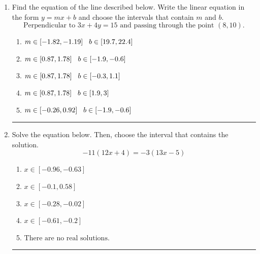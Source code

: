 \documentclass[14pt]{extbook}
\newcommand{\litem}[1]{\item#1\hspace*{-1cm}\rule{\textwidth}{0.4pt}}
\begin{document}
\begin{enumerate}
\litem{
Find the equation of the line described below. Write the linear equation in the form $ y=mx+b $ and choose the intervals that contain $m$ and $b$.\[ \text{Perpendicular to } 3 x + 4 y = 15 \text{ and passing through the point } (8, 10). \]\begin{enumerate}[label=\Alph*.]
\item \( m \in [-1.82, -1.19] \hspace*{3mm} b \in [19.7, 22.4] \)
\item \( m \in [0.87, 1.78] \hspace*{3mm} b \in [-1.9, -0.6] \)
\item \( m \in [0.87, 1.78] \hspace*{3mm} b \in [-0.3, 1.1] \)
\item \( m \in [0.87, 1.78] \hspace*{3mm} b \in [1.9, 3] \)
\item \( m \in [-0.26, 0.92] \hspace*{3mm} b \in [-1.9, -0.6] \)

\end{enumerate} }
\litem{
Solve the equation below. Then, choose the interval that contains the solution.\[ -11(12x + 4) = -3(13x -5) \]\begin{enumerate}[label=\Alph*.]
\item \( x \in [-0.96, -0.63] \)
\item \( x \in [-0.1, 0.58] \)
\item \( x \in [-0.28, -0.02] \)
\item \( x \in [-0.61, -0.2] \)
\item \( \text{There are no real solutions.} \)


\end{enumerate}}
\end{enumerate}
\end{document}
